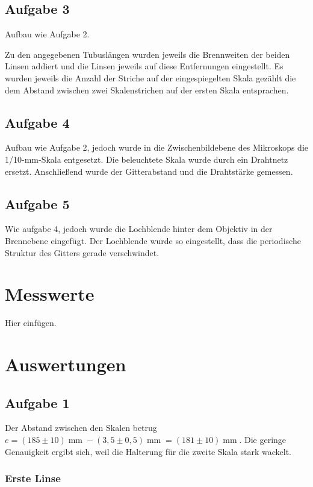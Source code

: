 \documentclass[a4paper,german,12pt,smallheadings]{scrartcl}
\begin{document}
\subsection{Aufgabe 3}

Aufbau wie Aufgabe 2.

Zu den angegebenen Tubuslängen wurden jeweils die Brennweiten der beiden Linsen
addiert und die Linsen jeweils auf diese Entfernungen eingestellt. Es wurden
jeweils die Anzahl der Striche auf der eingespiegelten Skala gezählt die dem
Abstand zwischen zwei Skalenstrichen auf der ersten Skala entsprachen.

\subsection{Aufgabe 4}

Aufbau wie Aufgabe 2, jedoch wurde in die Zwischenbildebene des Mikroskops die
1/10-mm-Skala entgesetzt. Die beleuchtete Skala wurde durch ein Drahtnetz
ersetzt. Anschließend wurde der Gitterabstand und die Drahtstärke gemessen.

\subsection{Aufgabe 5}

Wie aufgabe 4, jedoch wurde die Lochblende hinter dem Objektiv in der
Brennebene eingefügt. Der Lochblende wurde so eingestellt, dass die periodische
Struktur des Gitters gerade verschwindet.

\section{Messwerte}
Hier einfügen.

\section{Auswertungen}
\subsection{Aufgabe 1}

Der Abstand zwischen den Skalen betrug $e = (185\pm10) \operatorname{mm} -
(3{,}5\pm0{,}5) \operatorname{mm} = (181\pm10) \operatorname{mm}$. Die geringe
Genauigkeit ergibt sich, weil die Halterung für die zweite Skala stark wackelt.

\subsubsection{Erste Linse}
\end{document}
